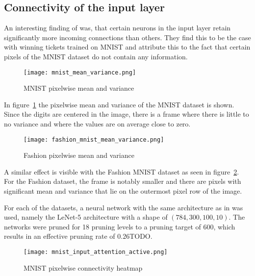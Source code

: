 \subsection{Connectivity of the input layer}
An interesting finding of \textcite{LTH} was, that certain neurons in the input layer retain significantly more incoming connections than others.
They find this to be the case with winning tickets trained on MNIST and attribute this to the fact that certain pixels of the MNIST dataset do not contain any information.
\begin{figure}[ht] %
    \centering \texttt{[image: mnist\_mean\_variance.png]}
    \caption{MNIST pixelwise mean and variance}\label{fig:mnist-input-variance}
\end{figure}

In figure~\ref{fig:mnist-input-variance} the pixelwise mean and variance of the MNIST dataset is shown.
Since the digits are centered in the image, there is a frame where there is little to no variance and where the values are on average close to zero.
\begin{figure}[ht] %
    \centering \texttt{[image: fashion\_mnist\_mean\_variance.png]}
    \caption{Fashion pixelwise mean and variance}\label{fig:fashion-input-variance}
\end{figure}

A similar effect is visible with the Fashion MNIST dataset as seen in figure~\ref{fig:fashion-input-variance}.
For the Fashion dataset, the frame is notably smaller and there are pixels with significant mean and variance that lie on the outermost pixel row of the image.

For each of the datasets, a neural network with the same architecture as in \autocite{LTH} was used, namely the LeNet-5 architecture with a shape of $(784,300,100,10)$.
The networks were pruned for 18 pruning levels to a pruning target of $600$, which results in an effective pruning rate of $0.26$TODO.

\begin{figure}[ht] %
    \centering\texttt{[image: mnist\_input\_attention\_active.png]}
    \caption{MNIST pixelwise connectivity heatmap}\label{fig:mnist-heatmap}
\end{figure}

